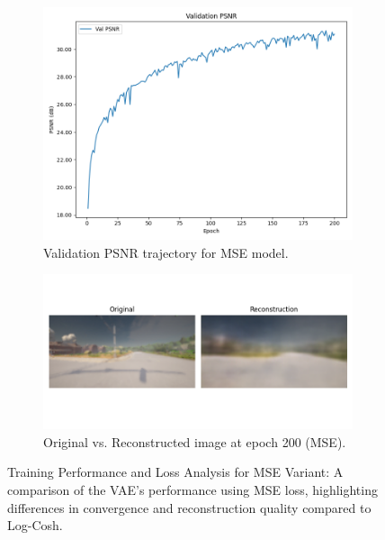 \begin{figure}[htbp]
    \begin{subfigure}[b]{0.45\textwidth}
        \includegraphics[width=\textwidth]{img/vae_results/200_epochs_128_ls_mse/mse_val_psnr.png}
        \caption{Validation PSNR trajectory for MSE model.}
        \label{fig:mse_val_psnr}
    \end{subfigure}
    \hfill
    \begin{subfigure}[b]{0.45\textwidth}
        \includegraphics[width=\textwidth]{img/vae_results/200_epochs_128_ls_mse/reconstructions/epoch_200.png}
        \caption{Original vs. Reconstructed image at epoch 200 (MSE).}
        \label{fig:mse_epoch200}
    \end{subfigure}
    
    \caption{Training Performance and Loss Analysis for MSE Variant: A comparison of the VAE's performance using MSE loss, highlighting differences in convergence and reconstruction quality compared to Log-Cosh.}
    \label{fig:mse_analysis}
\end{figure}










